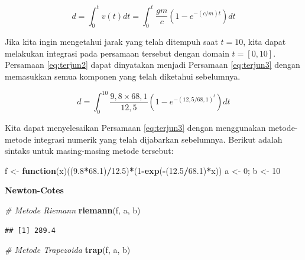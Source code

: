 \documentclass[]{book}
\newenvironment{Shaded}{\begin{snugshade}}{\end{snugshade}}
\newcommand{\CommentTok}[1]{\textcolor[rgb]{0.56,0.35,0.01}{\textit{#1}}}
\newcommand{\ControlFlowTok}[1]{\textcolor[rgb]{0.13,0.29,0.53}{\textbf{#1}}}
\newcommand{\DecValTok}[1]{\textcolor[rgb]{0.00,0.00,0.81}{#1}}
\newcommand{\FloatTok}[1]{\textcolor[rgb]{0.00,0.00,0.81}{#1}}
\newcommand{\KeywordTok}[1]{\textcolor[rgb]{0.13,0.29,0.53}{\textbf{#1}}}
\newcommand{\NormalTok}[1]{#1}
\newcommand{\OperatorTok}[1]{\textcolor[rgb]{0.81,0.36,0.00}{\textbf{#1}}}
\newcommand{\StringTok}[1]{\textcolor[rgb]{0.31,0.60,0.02}{#1}}
\theoremstyle{definition}
\theoremstyle{definition}
\theoremstyle{definition}
\theoremstyle{remark}
\begin{document}
\begin{equation}
d=\int_{0}^{t}v\left(t\right)dt=\int_{0}^{t}\frac{gm}{c}\left(1-e^{-\left(c/m\right)t}\right)dt
  \label{eq:terjun2}
\end{equation}

Jika kita ingin mengetahui jarak yang telah ditempuh saat \(t=10\), kita dapat melakukan integrasi pada persamaan tersebut dengan domain \(t=\left[0,10\right]\). Persamaan \eqref{eq:terjun2} dapat dinyatakan menjadi Persamaan \eqref{eq:terjun3} dengan memasukkan semua komponen yang telah diketahui sebelumnya.

\begin{equation}
d=\int_{0}^{10}\frac{9,8\times 68,1}{12,5}\left(1-e^{-\left(12,5/68,1\right)^t}\right)dt
  \label{eq:terjun3}
\end{equation}

Kita dapat menyelesaikan Persamaan \eqref{eq:terjun3} dengan menggunakan metode-metode integrasi numerik yang telah dijabarkan sebelumnya. Berikut adalah sintaks untuk masing-masing metode tersebut:

\begin{Shaded}
\begin{Highlighting}[]
\NormalTok{f <-}\StringTok{ }\ControlFlowTok{function}\NormalTok{(x)((}\FloatTok{9.8}\OperatorTok{*}\FloatTok{68.1}\NormalTok{)}\OperatorTok{/}\FloatTok{12.5}\NormalTok{)}\OperatorTok{*}\NormalTok{(}\DecValTok{1}\OperatorTok{-}\KeywordTok{exp}\NormalTok{(}\OperatorTok{-}\NormalTok{(}\FloatTok{12.5}\OperatorTok{/}\FloatTok{68.1}\NormalTok{)}\OperatorTok{*}\NormalTok{x))}
\NormalTok{a <-}\StringTok{ }\DecValTok{0}\NormalTok{; b <-}\StringTok{ }\DecValTok{10}
\end{Highlighting}
\end{Shaded}

\textbf{Newton-Cotes}

\begin{Shaded}
\begin{Highlighting}[]
\CommentTok{# Metode Riemann}
\KeywordTok{riemann}\NormalTok{(f, a, b)}
\end{Highlighting}
\end{Shaded}

\begin{verbatim}
## [1] 289.4
\end{verbatim}

\begin{Shaded}
\begin{Highlighting}[]
\CommentTok{# Metode Trapezoida}
\KeywordTok{trap}\NormalTok{(f, a, b)}
\end{Highlighting}
\end{Shaded}
\end{document}
